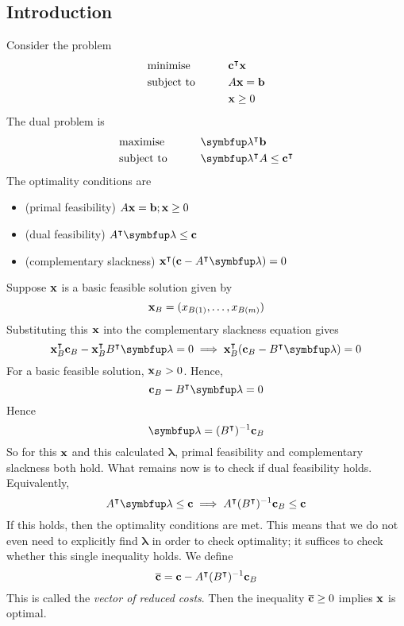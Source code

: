 \subsection{Introduction}
Consider the problem
\begin{alignat*}{2}
	 & \text{minimise}   & \qquad & \vb c^\intercal \vb x \\
	 & \text{subject to} &        & A \vb x = \vb b        \\
	 &                   &        & \vb x \geq 0
\end{alignat*}
The dual problem is
\begin{alignat*}{2}
	 & \text{maximise}   & \qquad & \bm \lambda^\transpose \vb b                   \\
	 & \text{subject to} &        & \bm \lambda^\transpose A \leq \vb c^\transpose \\
\end{alignat*}
The optimality conditions are
\begin{itemize}
	\item (primal feasibility) \( A \vb x = \vb b; \vb x \geq 0 \)
	\item (dual feasibility) \( A^\transpose \bm \lambda \leq \vb c \)
	\item (complementary slackness) \( \vb x^\transpose (\vb c - A^\transpose \bm \lambda) = 0 \)
\end{itemize}
Suppose \( \vb x \) is a basic feasible solution given by
\[
	\vb x_B = (x_{B(1)}, \dots, x_{B(m)})
\]
Substituting this \( \vb x \) into the complementary slackness equation gives
\[
	\vb x_B^\transpose \vb c_B - \vb x_B^\transpose B^\transpose \bm \lambda = 0 \implies \vb x_B^\transpose (\vb c_B - B^\transpose \bm \lambda) = 0
\]
For a basic feasible solution, \( \vb x_B > 0 \).
Hence,
\[
	\vb c_B - B^\transpose \bm \lambda = 0
\]
Hence
\[
	\bm \lambda = (B^\transpose)^{-1} \vb c_B
\]
So for this \( \vb x \) and this calculated \( \bm \lambda \), primal feasibility and complementary slackness both hold.
What remains now is to check if dual feasibility holds.
Equivalently,
\[
	A^\transpose \bm \lambda \leq \vb c \implies A^\transpose (B^\transpose)^{-1} \vb c_B \leq \vb c
\]
If this holds, then the optimality conditions are met.
This means that we do not even need to explicitly find \( \bm \lambda \) in order to check optimality; it suffices to check whether this single inequality holds.
We define
\[
	\overline{\vb c} = \vb c - A^\intercal (B^\intercal)^{-1} \vb c_B
\]
This is called the \textit{vector of reduced costs}.
Then the inequality \( \overline{\vb c} \geq 0 \) implies \( \vb x \) is optimal.

